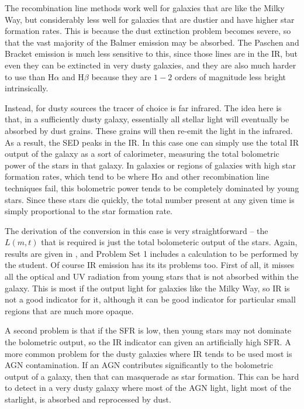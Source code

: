 The recombination line methods work well for galaxies that are like the Milky Way, but considerably less well for galaxies that are dustier and have higher star formation rates. This is because the dust extinction problem becomes severe, so that the vast majority of the Balmer emission may be absorbed. The Paschen and Bracket emission is much less sensitive to this, since those lines are in the IR, but even they can be extincted in very dusty galaxies, and they are also much harder to use than H$\alpha$ and H$\beta$ because they are $1-2$ orders of magnitude less bright intrinsically.

Instead, for dusty sources the tracer of choice is far infrared. The idea here is that, in a sufficiently dusty galaxy, essentially all stellar light will eventually be absorbed by dust grains. These grains will then re-emit the light in the infrared. As a result, the SED peaks in the IR. In this case one can simply use the total IR output of the galaxy as a sort of calorimeter, measuring the total bolometric power of the stars in that galaxy. In galaxies or regions of galaxies with high star formation rates, which tend to be where H$\alpha$ and other recombination line techniques fail, this bolometric power tends to be completely dominated by young stars. Since these stars die quickly, the total number present at any given time is simply proportional to the star formation rate.

The derivation of the conversion in this case is very straightforward -- the $L(m,t)$ that is required is just the total bolometeric output of the stars. Again, results are given in \citet{kennicutt12a}, and Problem Set 1 includes a calculation to be performed by the student. Of course IR emission has its its problems too. First of all, it misses all the optical and UV radiation from young stars that is not absorbed within the galaxy. This is most if the output light for galaxies like the Milky Way, so IR is not a good indicator for it, although it can be good indicator for particular small regions that are much more opaque.

A second problem is that if the SFR is low, then young stars may not dominate the bolometric output, so the IR indicator can given an artificially high SFR. A more common problem for the dusty galaxies where IR tends to be used most is AGN contamination. If an AGN contributes significantly to the bolometric output of a galaxy, then that can masquerade as star formation. This can be hard to detect in a very dusty galaxy where most of the AGN light, light most of the starlight, is absorbed and reprocessed by dust.

